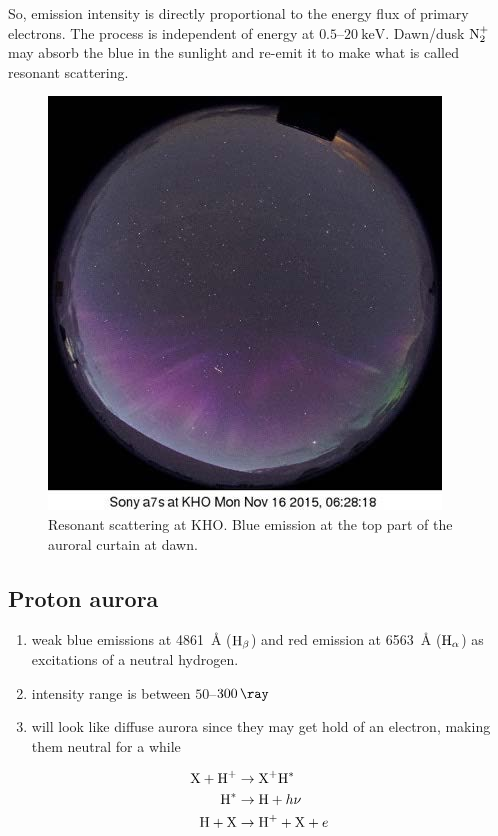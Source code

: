 So, emission intensity is directly proportional to the energy flux of primary electrons. The process is independent of energy at \(0.5\)--\(\SI{20}{\kilo\electronvolt}\). Dawn/dusk \(\textnormal{N}_2^+\) may absorb the blue in the sunlight and re-emit it to make what is called resonant scattering.
\begin{figure}[ht]
    \centering
    \includegraphics[width=.6\linewidth]{bilder/L4_resonant_scattering.jpg}
    \caption{Resonant scattering at KHO\@. Blue emission at the top part of the auroral curtain at dawn.}\label{fig:L4_resonant_scattering}
\end{figure}

\subsection{Proton aurora}
\begin{enumerate}[\(\bullet \)]
    \item weak {\color{blue}blue} emissions at \SI{4861}{\angstrom} (\(\textnormal{H}_\beta \)) and {\color{red}red} emission at \SI{6563}{\angstrom} (\(\textnormal{H}_\alpha \)) as excitations of a neutral hydrogen.
    \item intensity range is between \(50\)--\(\SI{300}{\ray}\)
    \item will look like diffuse aurora since they may get hold of an electron, making them neutral for a while
\end{enumerate}
\begin{align*}
    \textnormal{X}+\textnormal{H}^+&\rightarrow \textnormal{X}^+\textnormal{H}^*\\
    \textnormal{H}^*&\rightarrow \textnormal{H}+h\nu \\
    \textnormal{H}+\textnormal{X}&\rightarrow \textnormal{H}^++\textnormal{X}+e
\end{align*}

